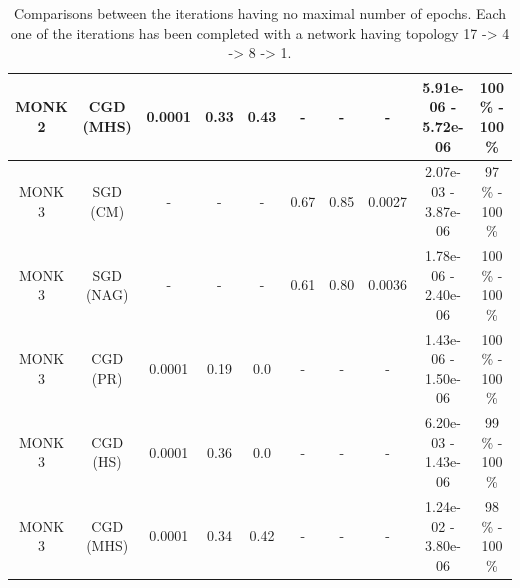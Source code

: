 \begin{table}[H]
\begin{subtable}{\textwidth}
{\begin{tabular}{| c | c | c | c | c | c | c | c | c | c |}
                            \hline
                            \rowcolor[gray]{.9}
                            MONK 2 &  CGD (MHS) &   0.0001 &     0.33 &  0.43 &     - &      - &       - &  5.91e-06 - 5.72e-06 &  100 \% - 100 \% \\
                            \hline
                            \hline
                            MONK 3 &   SGD (CM) &        - &        - &     - &  0.67 &   0.85 &  0.0027 &  2.07e-03 - 3.87e-06 &  97 \% - 100 \% \\
                            \hline
                            MONK 3 &  SGD (NAG) &        - &        - &     - &  0.61 &   0.80 &  0.0036 &  1.78e-06 - 2.40e-06 &  100 \% - 100 \% \\
                            \hline
                            \rowcolor[gray]{.9}
                            MONK 3 &   CGD (PR) &   0.0001 &     0.19 &  0.0 &     - &      - &       - &  1.43e-06 - 1.50e-06 &  100 \% - 100 \% \\
                            \hline
                            MONK 3 &   CGD (HS) &   0.0001 &     0.36 &  0.0 &     - &      - &       - &  6.20e-03 - 1.43e-06 &  99 \% - 100 \% \\
                            \hline
                            MONK 3 &  CGD (MHS) &   0.0001 &     0.34 &  0.42 &     - &      - &       - &  1.24e-02 - 3.80e-06 &  98 \% - 100 \% \\
                            \hline
                        \end{tabular}
                    }
                \end{subtable}
                \caption{Comparisons between the iterations having no maximal number of epochs. Each one of the
                iterations has been completed with a network having topology 17 -> 4 -> 8 -> 1.}
                \label{tab:monks_no_max_epochs}
            \end{table}

